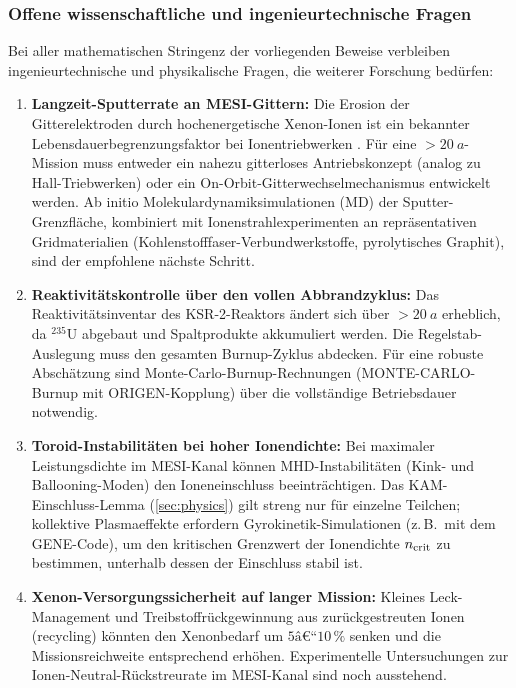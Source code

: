 ﻿\documentclass[a4paper,12pt,twoside]{article}
\theoremstyle{plain}
\theoremstyle{definition}
\theoremstyle{remark}
\begin{document}
	\subsubsection{Offene wissenschaftliche und ingenieurtechnische Fragen}

	Bei aller mathematischen Stringenz der vorliegenden Beweise verbleiben
	ingenieur\-technische und physikalische Fragen, die weiterer Forschung bedürfen:

	\begin{enumerate}
		\item \textbf{Langzeit-Sputterrate an MESI-Gittern:}
		Die Erosion der Gitterelektroden durch hochenergetische Xenon-Ionen ist
		ein bekannter Lebensdauerbegrenzungsfaktor bei Ionentriebwerken
		\cite{polk1999}. Für eine $>\SI{20}{a}$-Mission muss entweder
		ein nahezu gitterloses Antriebskonzept (analog zu Hall-Triebwerken)
		oder ein On-Orbit-Gitterwechselmechanismus entwickelt werden.
		Ab initio Molekulardynamiksimulationen (MD) der Sputter-Grenzfläche,
		kombiniert mit Ionenstrahlexperimenten an repräsentativen Gridmaterialien
		(Kohlenstofffaser-Verbundwerkstoffe, pyrolytisches Graphit), sind
		der empfohlene nächste Schritt.

		\item \textbf{Reaktivitätskontrolle über den vollen Abbrandzyklus:}
		Das Reaktivitätsinventar des KSR-2-Reaktors ändert sich über
		$>\SI{20}{a}$ erheblich, da $^{235}$U abgebaut und Spaltprodukte
		akkumuliert werden. Die Regelstab-Auslegung muss den gesamten
		Burnup-Zyklus abdecken. Für eine robuste Abschätzung sind
		Monte-Carlo-Burnup-Rechnungen (MONTE-CARLO-Burnup mit ORIGEN-Kopplung)
		über die vollständige Betriebsdauer notwendig.

		\item \textbf{Toroid-Instabilitäten bei hoher Ionendichte:}
		Bei maximaler Leistungsdichte im MESI-Kanal können MHD-Instabilitäten
		(Kink- und Ballooning-Moden) den Ioneneinschluss beeinträchtigen.
		Das KAM-Einschluss-Lemma (\cref{sec:physics}) gilt streng nur für
		einzelne Teilchen; kollektive Plasmaeffekte erfordern
		Gyrokinetik-Simulationen (z.\,B.\ mit dem GENE-Code), um den
		kritischen Grenzwert der Ionendichte $n_{\rm crit}$ zu bestimmen,
		unterhalb dessen der Einschluss stabil ist.

		\item \textbf{Xenon-Versorgungssicherheit auf langer Mission:}
		Kleines Leck-Management und Treibstoffrückgewinnung aus zurück\-gestreuten
		Ionen (recycling) könnten den Xenonbedarf um $5\text{â€“}10\,\%$ senken
		und die Missionsreichweite entsprechend erhöhen. Experimentelle
		Untersuchungen zur Ionen-Neutral-Rückstreurate im MESI-Kanal sind
		noch ausstehend.


\end{enumerate}
\end{document}

